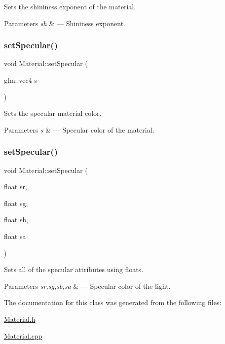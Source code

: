Sets the shininess exponent of the material. 


\begin{DoxyParams}{Parameters}
{\em sh} & --- Shininess exponent. \\
\hline
\end{DoxyParams}
\mbox{\label{class_material_a99ecd0beb0aae8eed8099a198be9e142}} 
\subsubsection{\texorpdfstring{set\+Specular()}{setSpecular()}\hspace{0.1cm}{\footnotesize\ttfamily [1/2]}}
{\footnotesize\ttfamily void Material\+::set\+Specular (\begin{DoxyParamCaption}\item[{glm\+::vec4}]{s }\end{DoxyParamCaption})}



Sets the specular material color. 


\begin{DoxyParams}{Parameters}
{\em s} & --- Specular color of the material. \\
\hline
\end{DoxyParams}
\mbox{\label{class_material_a9767d6b00b8d49174629baed01b7e3cf}} 
\subsubsection{\texorpdfstring{set\+Specular()}{setSpecular()}\hspace{0.1cm}{\footnotesize\ttfamily [2/2]}}
{\footnotesize\ttfamily void Material\+::set\+Specular (\begin{DoxyParamCaption}\item[{float}]{sr,  }\item[{float}]{sg,  }\item[{float}]{sb,  }\item[{float}]{sa }\end{DoxyParamCaption})}



Sets all of the specular attributes using floats. 


\begin{DoxyParams}{Parameters}
{\em sr,sg,sb,sa} & --- Specular color of the light. \\
\hline
\end{DoxyParams}


The documentation for this class was generated from the following files\+:\begin{DoxyCompactItemize}
\item 
\hyperlink{_material_8h}{Material.\+h}\item 
\hyperlink{_material_8cpp}{Material.\+cpp}\end{DoxyCompactItemize}
